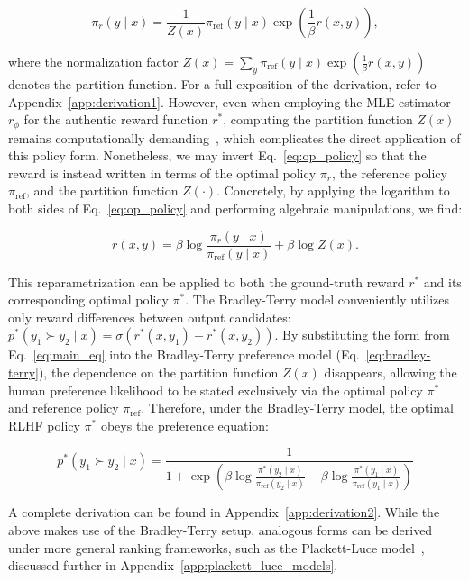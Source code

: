 \begin{equation}\label{eq:op_policy}
    \pi_r(y\mid x) = \frac{1}{Z(x)}\pi_\text{ref}(y\mid x)\exp\left(\frac{1}{\beta}r(x, y)\right),
\end{equation}

where the normalization factor $Z(x) =\sum_{y}\pi_\text{ref}(y\mid x)\exp\left(\frac{1}{\beta}r(x, y)\right)$ denotes the partition function. For a full exposition of the derivation, refer to Appendix~\ref{app:derivation1}. However, even when employing the MLE estimator $r_{\phi}$ for the authentic reward function $r^*$, computing the partition function $Z(x)$ remains computationally demanding~\citep{korbak2022reinforcement, go2023aligning}, which complicates the direct application of this policy form. Nonetheless, we may invert Eq.~\ref{eq:op_policy} so that the reward is instead written in terms of the optimal policy $\pi_r$, the reference policy $\pi_\text{ref}$, and the partition function $Z(\cdot)$. Concretely, by applying the logarithm to both sides of Eq.~\ref{eq:op_policy} and performing algebraic manipulations, we find:

\begin{equation}\label{eq:main_eq}
    r(x,y) =\beta \log \frac{\pi_r(y\mid x)}{\pi_\text{ref}(y\mid x)} + \beta \log Z(x).
\end{equation}

This reparametrization can be applied to both the ground-truth reward $r^*$ and its corresponding optimal policy $\pi^*$. The Bradley-Terry model conveniently utilizes only reward differences between output candidates: ${p^*(y_1 \succ y_2 \mid x) = \sigma(r^*(x, y_1) - r^*(x, y_2))}$. By substituting the form from Eq.~\ref{eq:main_eq} into the Bradley-Terry preference model (Eq.~\ref{eq:bradley-terry}), the dependence on the partition function $Z(x)$ disappears, allowing the human preference likelihood to be stated exclusively via the optimal policy $\pi^*$ and reference policy $\pi_\text{ref}$. Therefore, under the Bradley-Terry model, the optimal RLHF policy $\pi^*$ obeys the preference equation:

\begin{equation}\label{eq:objective}
    p^*(y_1\succ y_2 \mid x)=\frac{1}{1 + \exp\left(\beta \log \frac{\pi^*(y_2\mid x)}{\pi_\text{ref}(y_2\mid x)} - \beta \log \frac{\pi^*(y_1\mid x)}{\pi_\text{ref}(y_1\mid x)}\right)}
\end{equation}

A complete derivation can be found in Appendix~\ref{app:derivation2}. While the above makes use of the Bradley-Terry setup, analogous forms can be derived under more general ranking frameworks, such as the Plackett-Luce model~\citep{plackett1975analysis, luce2012individual}, discussed further in Appendix~\ref{app:plackett_luce_models}.

